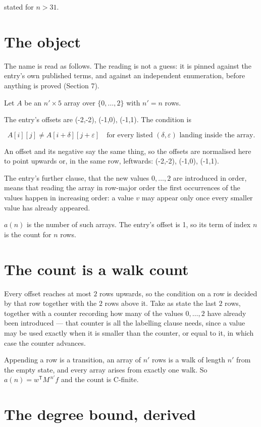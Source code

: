 \documentclass[11pt]{article}
\theoremstyle{definition}
\begin{document}
stated for $n > 31$.

\section{The object}

The name is read as follows. The reading is not a guess: it is pinned against the entry's own published terms, and against an independent enumeration, before anything is proved (Section 7).

Let $A$ be an $n' \times 5$ array over $\{0,\dots,2\}$ with $n' = n$ rows.

The entry's offsets are (-2,-2), (-1,0), (-1,1). The condition is

\[A[i][j] \ne A[i{+}\delta][j{+}\varepsilon]\quad\text{for every listed }(\delta,\varepsilon)\text{ landing inside the array.}\]

An offset and its negative say the same thing, so the offsets are normalised here to point upwards or, in the same row, leftwards: (-2,-2), (-1,0), (-1,1).

The entry's further clause, that the new values $0,\dots,2$ are introduced in order, means that reading the array in row-major order the first occurrences of the values happen in increasing order: a value $v$ may appear only once every smaller value has already appeared.

$a(n)$ is the number of such arrays. The entry's offset is 1, so its term of index $n$ is the count for $n$ rows.

\section{The count is a walk count}

Every offset reaches at most $2$ rows upwards, so the condition on a row is decided by that row together with the $2$ rows above it. Take as state the last $2$ rows, together with a counter recording how many of the values $0,\dots,2$ have already been introduced --- that counter is all the labelling clause needs, since a value may be used exactly when it is smaller than the counter, or equal to it, in which case the counter advances.

Appending a row is a transition, an array of $n'$ rows is a walk of length $n'$ from the empty state, and every array arises from exactly one walk. So $a(n) = w^{\mathsf T}M^{\,n'}f$ and the count is C-finite.

\section{The degree bound, derived}
\end{document}
